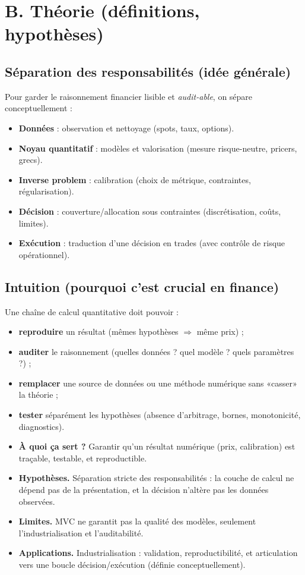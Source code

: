 \documentclass[11pt,a4paper]{report}
\theoremstyle{definition}
\theoremstyle{plain}
\theoremstyle{remark}
\newcommand{\1}{\mathbf{1}}
\newcommand{\qa}[4]{
\begin{itemize}[leftmargin=*]
\item \textbf{À quoi ça sert ?} #1
\item \textbf{Hypothèses.} #2
\item \textbf{Limites.} #3
\item \textbf{Applications.} #4
\end{itemize}
}
\begin{document}
\section{B. Théorie (définitions, hypothèses)}
\subsection*{Séparation des responsabilités (idée générale)}
Pour garder le raisonnement financier lisible et \emph{audit-able}, on sépare conceptuellement :
\begin{itemize}[leftmargin=*]
\item \textbf{Données} : observation et nettoyage (spots, taux, options).
\item \textbf{Noyau quantitatif} : modèles et valorisation (mesure risque-neutre, pricers, grecs).
\item \textbf{Inverse problem} : calibration (choix de métrique, contraintes, régularisation).
\item \textbf{Décision} : couverture/allocation sous contraintes (discrétisation, coûts, limites).
\item \textbf{Exécution} : traduction d'une décision en trades (avec contrôle de risque opérationnel).
\end{itemize}

\subsection*{Intuition (pourquoi c'est crucial en finance)}
Une chaîne de calcul quantitative doit pouvoir :
\begin{itemize}[leftmargin=*]
\item \textbf{reproduire} un résultat (mêmes hypothèses $\Rightarrow$ même prix) ;
\item \textbf{auditer} le raisonnement (quelles données ? quel modèle ? quels paramètres ?) ;
\item \textbf{remplacer} une source de données ou une méthode numérique sans «casser» la théorie ;
\item \textbf{tester} séparément les hypothèses (absence d'arbitrage, bornes, monotonicité, diagnostics).
\end{itemize}

\qa
{Garantir qu'un résultat numérique (prix, calibration) est traçable, testable, et reproductible.}
{Séparation stricte des responsabilités : la couche de calcul ne dépend pas de la présentation, et la décision n'altère pas les données observées.}
{MVC ne garantit pas la qualité des modèles, seulement l'industrialisation et l'auditabilité.}
{Industrialisation : validation, reproductibilité, et articulation vers une boucle décision/exécution (définie conceptuellement).}
\end{document}
